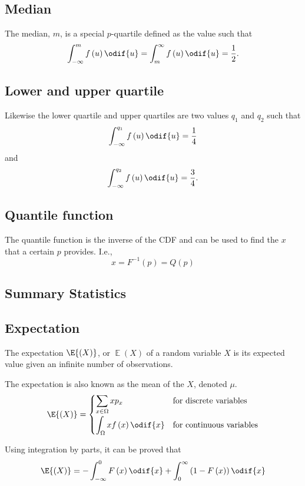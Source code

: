 \documentclass{article}
\begin{document}
\begin{multicols}{3}
    \subsection{Median}
    The median, \(m\), is a special \(p\)-quartile defined as the value such that
    \begin{equation*}
        \int_{-\infty}^m f\left( u \right) \odif{u} = \int^{\infty}_m f\left( u \right) \odif{u} = \frac{1}{2}.
    \end{equation*}
    \subsection{Lower and upper quartile}
    Likewise the lower quartile and upper quartiles are two values \(q_1\) and \(q_2\) such that
    \begin{equation*}
        \int_{-\infty}^{q_1} f\left( u \right) \odif{u} = \frac{1}{4}
    \end{equation*}
    and
    \begin{equation*}
        \int_{-\infty}^{q_2} f\left( u \right) \odif{u} = \frac{3}{4}.
    \end{equation*}
    \subsection{Quantile function}
    The quantile function is the inverse of the CDF
    and can be used to find the \(x\) that a certain \(p\) provides. I.e.,
    \begin{equation*}
        x = F^{-1}\left( p \right) = Q\left( p \right)
    \end{equation*}
    \subsection{Summary Statistics}
    \subsection{Expectation}
    The expectation \(\E{\left( X \right)}\), or \(\operatorname{\mathbb{E}}{\left( X \right)}\)
    of a random variable \(X\) is its expected value given an
    infinite number of observations.

    The expectation is also known as the mean of the \(X\), denoted \(\mu\).
    \begin{equation*}
        \E{\left( X \right)} =
        \begin{cases}
            \displaystyle \sum_{x \in \Omega} x p_x                & \text{for discrete variables}   \\[0.4cm]
            \displaystyle \int_\Omega x f\left( x \right) \odif{x} & \text{for continuous variables}
        \end{cases}
    \end{equation*}
    \begin{theorem}
        Using integration by parts, it can be proved that
        \begin{equation*}
            \E{\left(X\right)} = -\int_{-\infty}^0 F\left( x \right) \odif{x} + \int_0^\infty \left(1 - F\left( x \right)\right) \odif{x}
        \end{equation*}
    \end{theorem}

\end{multicols}
\end{document}
